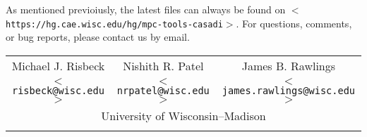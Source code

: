 \documentclass{article}
\newcommand{\smallurl}[2][\scriptsize]{\texttt{#1$<$#2$>$}}
\begin{document}
As mentioned previoiusly, the latest files can always be found on \smallurl{https://hg.cae.wisc.edu/hg/mpc-tools-casadi}.
For questions, comments, or bug reports, please contact us by email.

\begin{center}
\begin{tabular}{ccc}
    Michael J. Risbeck & Nishith R. Patel & James B. Rawlings \\
    \smallurl[\small]{risbeck@wisc.edu} & \smallurl[\small]{nrpatel@wisc.edu} & \smallurl[\small]{james.rawlings@wisc.edu} \\
    \multicolumn{3}{c}{University of Wisconsin--Madison} \\
    \hspace*{.2\textwidth} & \hspace*{.2\textwidth} & \hspace*{.2\textwidth} %
\end{tabular}
\end{center}
\end{document}
